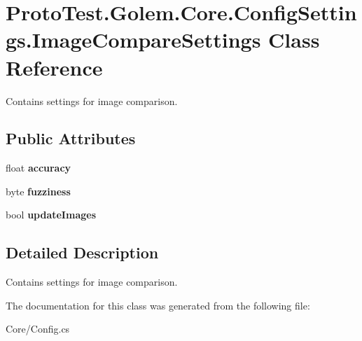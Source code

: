 \hypertarget{class_proto_test_1_1_golem_1_1_core_1_1_config_settings_1_1_image_compare_settings}{\section{Proto\-Test.\-Golem.\-Core.\-Config\-Settings.\-Image\-Compare\-Settings Class Reference}
\label{class_proto_test_1_1_golem_1_1_core_1_1_config_settings_1_1_image_compare_settings}
}


Contains settings for image comparison.  


\subsection*{Public Attributes}
\begin{DoxyCompactItemize}
\item 
\hypertarget{class_proto_test_1_1_golem_1_1_core_1_1_config_settings_1_1_image_compare_settings_acfd8e7a15e5aad892ad4944c8a6d17d1}{float {\bfseries accuracy}}\label{class_proto_test_1_1_golem_1_1_core_1_1_config_settings_1_1_image_compare_settings_acfd8e7a15e5aad892ad4944c8a6d17d1}

\item 
\hypertarget{class_proto_test_1_1_golem_1_1_core_1_1_config_settings_1_1_image_compare_settings_a571f08a667ddb0acd19e861b77e09faa}{byte {\bfseries fuzziness}}\label{class_proto_test_1_1_golem_1_1_core_1_1_config_settings_1_1_image_compare_settings_a571f08a667ddb0acd19e861b77e09faa}

\item 
\hypertarget{class_proto_test_1_1_golem_1_1_core_1_1_config_settings_1_1_image_compare_settings_a40d57ae87376dfc98b21d917de343d4e}{bool {\bfseries update\-Images}}\label{class_proto_test_1_1_golem_1_1_core_1_1_config_settings_1_1_image_compare_settings_a40d57ae87376dfc98b21d917de343d4e}

\end{DoxyCompactItemize}


\subsection{Detailed Description}
Contains settings for image comparison. 



The documentation for this class was generated from the following file\-:\begin{DoxyCompactItemize}
\item 
Core/Config.\-cs\end{DoxyCompactItemize}
